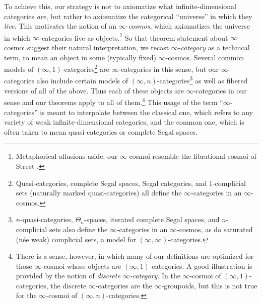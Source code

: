To achieve this, our strategy is not to axiomatize what infinite-dimensional categories \emph{are}, but rather to axiomatize the categorical ``universe'' in which they \emph{live}. This motivates the notion of an $\infty$-\emph{cosmos},
which axiomatizes the universe in which $\infty$-categories live as objects.\footnote{Metaphorical allusions aside, our $\infty$-cosmoi resemble the fibrational cosmoi of Street \cite{Street:1974ec}.} So that theorem statement about $\infty$-cosmoi suggest their natural interpretation, we recast $\infty$-\emph{category} as a technical term, to mean an object in some (typically fixed) $\infty$-cosmos. Several common models of $(\infty,1)$-cat\-e\-go\-ries\footnote{Quasi-categories, complete Segal spaces, Segal categories, and 1-complicial sets (naturally marked quasi-categories) all define the \texorpdfstring{$\infty$}{infinity}-categories in an \texorpdfstring{$\infty$}{infinity}-cosmos.} are $\infty$-categories in this sense, but our $\infty$-categories also include certain models of $(\infty,n)$-categories\footnote{$n$-quasi-categories, $\Theta_n$-spaces, iterated complete Segal spaces, and $n$-complicial sets also define the \texorpdfstring{$\infty$}{infinity}-categories in an \texorpdfstring{$\infty$}{infinity}-cosmos, as do saturated (n\'{e}e weak) complicial sets, a model for \texorpdfstring{$(\infty,\infty)$}{(infinity,infinity)}-categories.} as well as fibered versions of all of the above. Thus each of these objects are $\infty$-cat\-e\-go\-ries in our sense and our theorems apply to all of them.\footnote{There is a sense, however, in which many of our definitions are optimized for those \texorpdfstring{$\infty$}{infinity}-cosmoi whose objects are \texorpdfstring{$(\infty,1)$}{(infinity,1)}-categories. A good illustration  is provided by the notion of \emph{discrete \texorpdfstring{$\infty$}{infinity}-category}. %
 In the \texorpdfstring{$\infty$}{infinity}-cosmoi of \texorpdfstring{$(\infty,1)$}{(infinity,1)}-categories, the discrete \texorpdfstring{$\infty$}{infinity}-categories are the \texorpdfstring{$\infty$}{infinity}-groupoids, but this is not true for the \texorpdfstring{$\infty$}{infinity}-cosmoi of \texorpdfstring{$(\infty,n)$}{(infinity,n)}-categories.} This usage of the term ``$\infty$-categories'' is meant to interpolate between the classical one, which refers to any variety of weak infinite-dimensional categories, and the common one, which is often taken to mean quasi-categories or complete Segal spaces.

